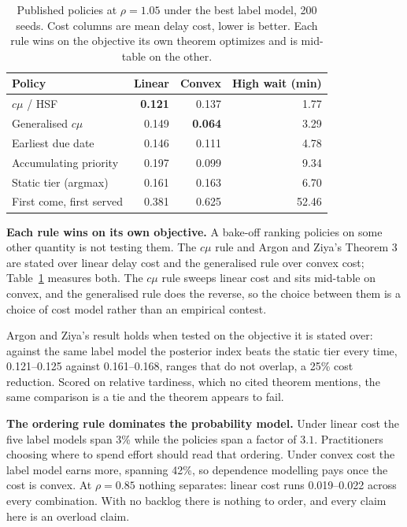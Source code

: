 \begin{table}[t]
\caption{Published policies at $\rho=1.05$ under the best label model, 200
seeds. Cost columns are mean delay cost, lower is better. Each rule wins on the
objective its own theorem optimizes and is mid-table on the other.}
\label{tab:policies}
\centering
\small
\begin{tabular}{@{}lrrr@{}}
\toprule
Policy & Linear & Convex & High wait (min) \\
\midrule
$c\mu$ / HSF \cite{cox1961queues}        & \textbf{0.121} & 0.137 & 1.77 \\
Generalised $c\mu$ \cite{vanmieghem1995generalized} & 0.149 & \textbf{0.064} & 3.29 \\
Earliest due date                        & 0.146 & 0.111 & 4.78 \\
Accumulating priority                    & 0.197 & 0.099 & 9.34 \\
Static tier (argmax)                     & 0.161 & 0.163 & 6.70 \\
First come, first served                 & 0.381 & 0.625 & 52.46 \\
\bottomrule
\end{tabular}
\end{table}

\textbf{Each rule wins on its own objective.} A bake-off ranking policies on
some other quantity is not testing them. The $c\mu$ rule and Argon and Ziya's
Theorem 3 are stated over linear delay cost and the generalised rule over convex
cost; Table~\ref{tab:policies} measures both. The $c\mu$ rule sweeps linear cost
and sits mid-table on convex, and the generalised rule does the reverse, so the
choice between them is a choice of cost model rather than an empirical contest.

Argon and Ziya's result holds when tested on the objective it is stated over:
against the same label model the posterior index beats the static tier every
time, 0.121--0.125 against 0.161--0.168, ranges that do not overlap, a 25\% cost
reduction. Scored on relative tardiness, which no cited theorem mentions, the
same comparison is a tie and the theorem appears to fail.

\textbf{The ordering rule dominates the probability model.} Under linear cost
the five label models span 3\% while the policies span a factor of $3.1$.
Practitioners choosing where to spend effort should read that ordering. Under
convex cost the label model earns more, spanning 42\%, so dependence modelling
pays once the cost is convex. At $\rho=0.85$ nothing separates: linear cost runs
0.019--0.022 across every combination. With no backlog there is nothing to
order, and every claim here is an overload claim.

